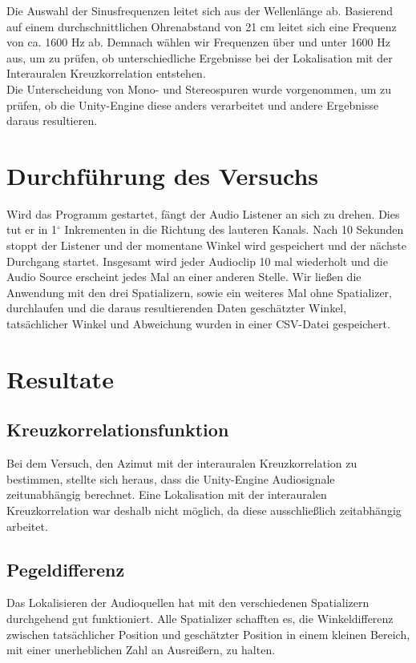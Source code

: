 \documentclass[12pt,a4paper]{article}
\begin{document}
Die Auswahl der Sinusfrequenzen leitet sich aus der Wellenlänge ab. Basierend auf einem durchschnittlichen Ohrenabstand von 21 cm leitet sich eine Frequenz von ca. 1600 Hz ab. Demnach wählen wir Frequenzen über und unter 1600 Hz aus, um zu prüfen, ob unterschiedliche Ergebnisse bei der Lokalisation mit der Interauralen Kreuzkorrelation entstehen.\\

Die Unterscheidung von Mono- und Stereospuren wurde vorgenommen, um zu prüfen, ob die Unity-Engine diese anders verarbeitet und andere Ergebnisse daraus resultieren. 

\section{Durchführung des Versuchs}
Wird das Programm gestartet, fängt der Audio Listener an sich zu drehen. Dies tut er in 1$^\circ$ Inkrementen in die Richtung des lauteren Kanals. Nach 10 Sekunden stoppt der Listener und der momentane Winkel wird gespeichert und der nächste Durchgang startet. Insgesamt wird jeder Audioclip 10 mal wiederholt und die Audio Source erscheint jedes Mal an einer anderen Stelle. Wir ließen die Anwendung mit den drei Spatializern, sowie ein weiteres Mal ohne Spatializer, durchlaufen und die daraus resultierenden Daten geschätzter Winkel, tatsächlicher Winkel und Abweichung wurden in einer CSV-Datei gespeichert.
\section{Resultate}
\subsection{Kreuzkorrelationsfunktion}
Bei dem Versuch, den Azimut mit der interauralen Kreuzkorrelation zu bestimmen, stellte sich heraus, dass die Unity-Engine Audiosignale zeitunabhängig berechnet. Eine Lokalisation mit der interauralen Kreuzkorrelation war deshalb nicht möglich, da diese ausschließlich zeitabhängig arbeitet.

\subsection{Pegeldifferenz}
Das Lokalisieren der Audioquellen hat mit den verschiedenen Spatializern durchgehend gut funktioniert. Alle Spatializer schafften es, die Winkeldifferenz zwischen tatsächlicher Position und geschätzter Position in einem kleinen Bereich, mit einer unerheblichen Zahl an Ausreißern, zu halten.\\
\end{document}
